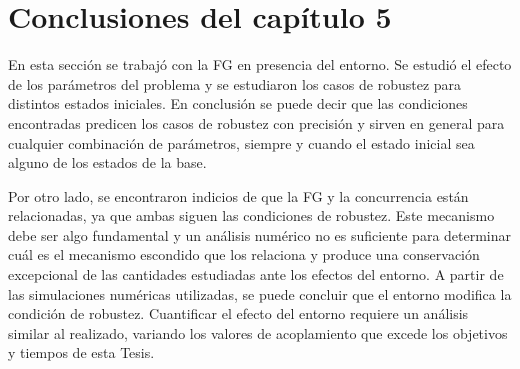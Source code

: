 \section{Conclusiones del capítulo 5}

En esta sección se trabajó con la FG en presencia del entorno. Se estudió el efecto de los parámetros del problema y se estudiaron los casos de robustez para distintos estados iniciales. En conclusión se puede decir que las condiciones encontradas predicen los casos de robustez con precisión y sirven en general para cualquier combinación de parámetros, siempre y cuando el estado inicial sea alguno de los estados de la base. 

Por otro lado, se encontraron indicios de que la FG y la concurrencia están relacionadas, ya que ambas siguen las condiciones de robustez. Este mecanismo debe ser algo fundamental y un análisis numérico no es suficiente para determinar cuál es el mecanismo escondido que los relaciona y produce una conservación excepcional de las cantidades estudiadas ante los efectos del entorno. A partir de las simulaciones numéricas utilizadas, se puede concluir que el entorno modifica la condición de robustez. Cuantificar el efecto del entorno requiere un análisis similar al realizado, variando los valores de acoplamiento que excede los objetivos y tiempos de esta Tesis.




